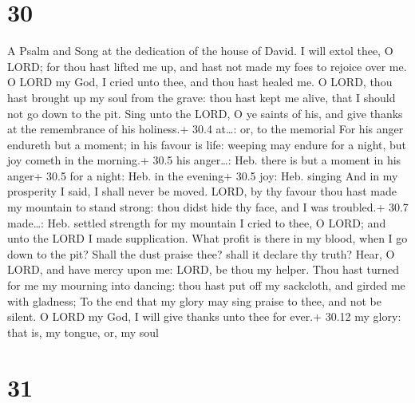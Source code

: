 \hypertarget{section-29}{%
\section{30}\label{section-29}}

A Psalm and Song at the dedication of the house of David.  I
will extol thee, O LORD; for thou hast lifted me up, and hast not made
my foes to rejoice over me.  O LORD my God, I cried unto
thee, and thou hast healed me.  O LORD, thou hast brought up
my soul from the grave: thou hast kept me alive, that I should not go
down to the pit.  Sing unto the LORD, O ye saints of his,
and give thanks at the remembrance of his holiness.+ 30.4 at\ldots: or,
to the memorial  For his anger endureth but a moment; in his
favour is life: weeping may endure for a night, but joy cometh in the
morning.+ 30.5 his anger\ldots: Heb. there is but a moment in his anger+
30.5 for a night: Heb. in the evening+ 30.5 joy: Heb. singing
 And in my prosperity I said, I shall never be moved.
 LORD, by thy favour thou hast made my mountain to stand
strong: thou didst hide thy face, and I was troubled.+ 30.7 made\ldots:
Heb. settled strength for my mountain  I cried to thee, O
LORD; and unto the LORD I made supplication.  What profit is
there in my blood, when I go down to the pit? Shall the dust praise
thee? shall it declare thy truth?  Hear, O LORD, and have
mercy upon me: LORD, be thou my helper.  Thou hast turned
for me my mourning into dancing: thou hast put off my sackcloth, and
girded me with gladness;  To the end that my glory may sing
praise to thee, and not be silent. O LORD my God, I will give thanks
unto thee for ever.+ 30.12 my glory: that is, my tongue, or, my soul

\hypertarget{section-30}{%
\section{31}\label{section-30}}


